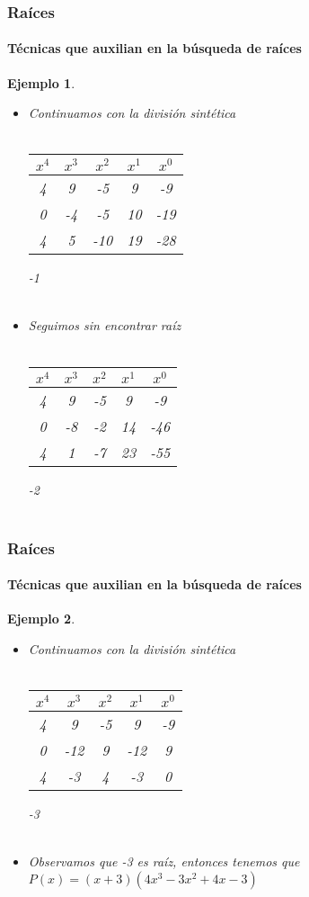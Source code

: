 \documentclass[11pt]{beamer}
\newtheorem{ejem}{Ejemplo}
\begin{document}
\begin{frame}
\frametitle{Raíces}
\framesubtitle{Técnicas que auxilian en la búsqueda de raíces}
\begin{ejem}
\begin{itemize}
\item Continuamos con la división sintética\\ \hspace{0cm} \\
\begin{tabular}{c|c|c|c|c|}
$x^4$ & $x^3$ & $x^2$ & $x^1$ & $x^0$\\ \hline
4 & 9 & -5 & 9 & -9\\ 
0 & -4 & -5 & 10 & -19 \\ \hline
4 & 5 & -10 & 19 & -28
\end{tabular}
-1\\ \hspace{0cm} \\
\item Seguimos sin encontrar raíz \\ \hspace{0cm} \\
\begin{tabular}{c|c|c|c|c|}
$x^4$ & $x^3$ & $x^2$ & $x^1$ & $x^0$\\ \hline
4 & 9 & -5 & 9 & -9\\ 
0 & -8 & -2 & 14 & -46\\ \hline
4 & 1 & -7 & 23 & -55
\end{tabular}
-2\\ \hspace{0cm} \\
\end{itemize}
\end{ejem}
\end{frame}

\begin{frame}
\frametitle{Raíces}
\framesubtitle{Técnicas que auxilian en la búsqueda de raíces}
\begin{ejem}
\begin{itemize}
\item Continuamos con la división sintética\\ \hspace{0cm} \\
\begin{tabular}{c|c|c|c|c|}
$x^4$ & $x^3$ & $x^2$ & $x^1$ & $x^0$\\ \hline
4 & 9 & -5 & 9 & -9\\ 
0 & -12 & 9 & -12 & 9 \\ \hline
4 & -3 & 4 & -3 & 0
\end{tabular}
-3\\ \hspace{0cm} \\
\item Observamos que -3 es raíz, entonces tenemos que $P(x) = (x+3)(4x^3 - 3x^2 + 4x -3)$ \\ \hspace{0cm} \\
\end{itemize}
\end{ejem}
\end{frame}
\end{document}
